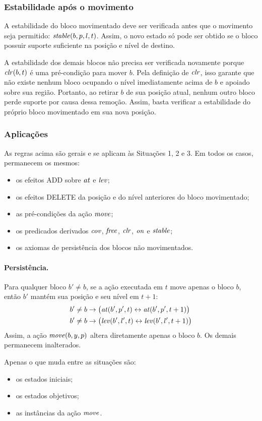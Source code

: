 \subsubsection{Estabilidade após o movimento}
A estabilidade do bloco movimentado deve ser verificada antes que o movimento seja permitido: $\mathit{stable}(b,p,l,t)$.
Assim, o novo estado só pode ser obtido se o bloco possuir suporte suficiente na posição e nível de destino.

A estabilidade dos demais blocos não precisa ser verificada novamente porque $\mathit{clr}(b,t)$ é uma pré-condição para mover $b$. Pela definição de $\mathit{clr}$, isso garante que não existe nenhum bloco ocupando o nível imediatamente acima de $b$ e apoiado sobre sua região. Portanto, ao retirar $b$ de sua posição atual, nenhum outro bloco perde suporte por causa dessa remoção. Assim, basta verificar a estabilidade do próprio bloco movimentado em sua nova posição.

\subsubsection{Aplicações}
As regras acima são gerais e se aplicam às Situações 1, 2 e 3.
Em todos os casos, permanecem os mesmos:
\begin{itemize}
\item os efeitos ADD sobre $\mathit{at}$ e $\mathit{lev}$;
\item os efeitos DELETE da posição e do nível anteriores do bloco movimentado;
\item as pré-condições da ação $\mathit{move}$;
\item os predicados derivados $\mathit{cov}$, $\mathit{free}$, $\mathit{clr}$, $\mathit{on}$ e $\mathit{stable}$;
\item os axiomas de persistência dos blocos não movimentados.
\end{itemize}

\paragraph{Persistência.} Para qualquer bloco $b'\neq b$, se a ação executada em $t$ move apenas o bloco $b$, então $b'$ mantém sua posição e seu nível em $t+1$:
\begin{align*}
b'\neq b &\rightarrow \bigl(\mathit{at}(b',p',t)\leftrightarrow\mathit{at}(b',p',t+1)\bigr)\\
b'\neq b &\rightarrow \bigl(\mathit{lev}(b',l',t)\leftrightarrow\mathit{lev}(b',l',t+1)\bigr)
\end{align*}
Assim, a ação $\mathit{move}(b,y,p)$ altera diretamente apenas o bloco $b$. Os demais permanecem inalterados.

Apenas o que muda entre as situações são:
\begin{itemize}
\item os estados iniciais;
\item os estados objetivos;
\item as instâncias da ação $\mathit{move}$.
\end{itemize}

